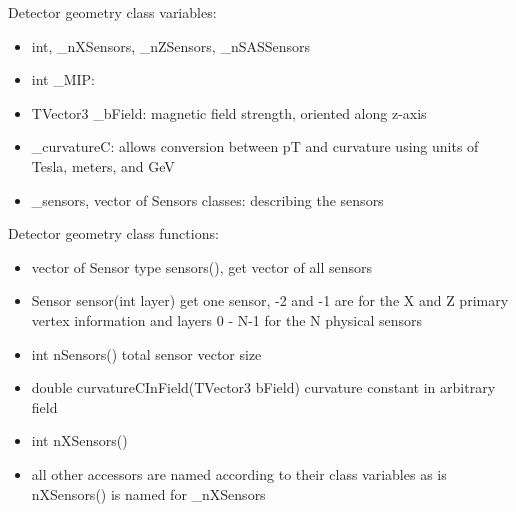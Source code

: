 \documentclass[aps,prd,superscriptaddress,floatfix]{revtex4}
\begin{document}
Detector geometry class variables:
\begin{itemize}
\item int, \_nXSensors, \_nZSensors, \_nSASSensors 
\item int \_MIP: 
\item TVector3 \_bField: magnetic field strength, oriented along z-axis
\item \_curvatureC: allows conversion between pT and curvature using units of Tesla, meters, and GeV
\item \_sensors, vector of Sensors classes: describing the sensors
\end{itemize}

Detector geometry class functions:
\begin{itemize}
\item vector of Sensor type sensors(), get vector of all sensors
\item Sensor sensor(int layer) get one sensor, -2 and -1 are for the X and Z
  primary vertex information and layers 0 - N-1 for the N physical
  sensors
\item int nSensors() total sensor vector size
\item double curvatureCInField(TVector3 bField) curvature constant in arbitrary field
\item int nXSensors()
\item all other accessors are named according to their class variables
  as is nXSensors() is named for \_nXSensors
\end{itemize}
\end{document}
